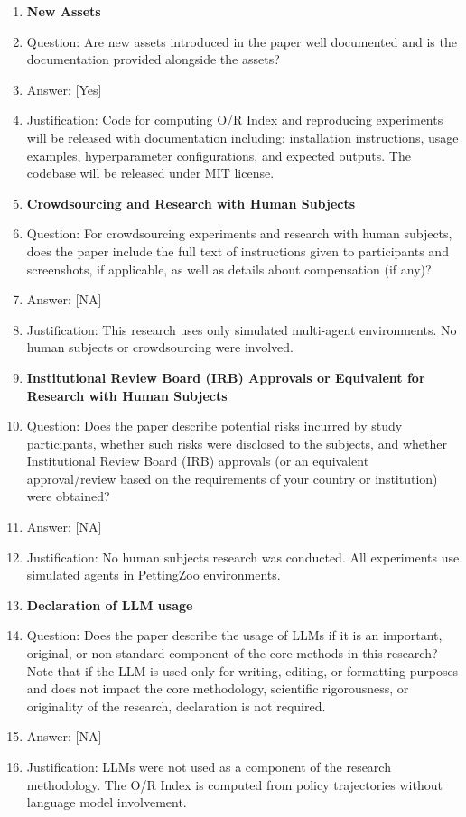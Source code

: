\documentclass[twoside]{article}
\theoremstyle{remark}
\newcommand{\answerYes}{[Yes]}
\newcommand{\answerNA}{[NA]}
\begin{document}
\begin{enumerate}
\item {\bf New Assets}
    \item[] Question: Are new assets introduced in the paper well documented and is the documentation provided alongside the assets?
    \item[] Answer: \answerYes{}
    \item[] Justification: Code for computing O/R Index and reproducing experiments will be released with documentation including: installation instructions, usage examples, hyperparameter configurations, and expected outputs. The codebase will be released under MIT license.

\item {\bf Crowdsourcing and Research with Human Subjects}
    \item[] Question: For crowdsourcing experiments and research with human subjects, does the paper include the full text of instructions given to participants and screenshots, if applicable, as well as details about compensation (if any)?
    \item[] Answer: \answerNA{}
    \item[] Justification: This research uses only simulated multi-agent environments. No human subjects or crowdsourcing were involved.

\item {\bf Institutional Review Board (IRB) Approvals or Equivalent for Research with Human Subjects}
    \item[] Question: Does the paper describe potential risks incurred by study participants, whether such risks were disclosed to the subjects, and whether Institutional Review Board (IRB) approvals (or an equivalent approval/review based on the requirements of your country or institution) were obtained?
    \item[] Answer: \answerNA{}
    \item[] Justification: No human subjects research was conducted. All experiments use simulated agents in PettingZoo environments.

\item {\bf Declaration of LLM usage}
    \item[] Question: Does the paper describe the usage of LLMs if it is an important, original, or non-standard component of the core methods in this research? Note that if the LLM is used only for writing, editing, or formatting purposes and does not impact the core methodology, scientific rigorousness, or originality of the research, declaration is not required.
    \item[] Answer: \answerNA{}
    \item[] Justification: LLMs were not used as a component of the research methodology. The O/R Index is computed from policy trajectories without language model involvement.

\end{enumerate}
\end{document}
